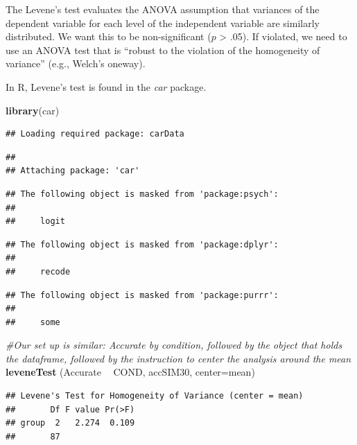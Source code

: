 \documentclass[
  english,
]{book}
\newenvironment{Shaded}{\begin{snugshade}}{\end{snugshade}}
\newcommand{\CommentTok}[1]{\textcolor[rgb]{0.56,0.35,0.01}{\textit{#1}}}
\newcommand{\DataTypeTok}[1]{\textcolor[rgb]{0.13,0.29,0.53}{#1}}
\newcommand{\KeywordTok}[1]{\textcolor[rgb]{0.13,0.29,0.53}{\textbf{#1}}}
\newcommand{\NormalTok}[1]{#1}
\newcommand{\OperatorTok}[1]{\textcolor[rgb]{0.81,0.36,0.00}{\textbf{#1}}}
\newcommand{\StringTok}[1]{\textcolor[rgb]{0.31,0.60,0.02}{#1}}
\begin{document}
The Levene's test evaluates the ANOVA assumption that variances of the dependent variable for each level of the independent variable are similarly distributed. We want this to be non-significant (\(p\) \textgreater{} .05). If violated, we need to use an ANOVA test that is ``robust to the violation of the homogeneity of variance'' (e.g., Welch's oneway).

In R, Levene's test is found in the \emph{car} package.

\begin{Shaded}
\begin{Highlighting}[]
\KeywordTok{library}\NormalTok{(car)}
\end{Highlighting}
\end{Shaded}

\begin{verbatim}
## Loading required package: carData
\end{verbatim}

\begin{verbatim}
## 
## Attaching package: 'car'
\end{verbatim}

\begin{verbatim}
## The following object is masked from 'package:psych':
## 
##     logit
\end{verbatim}

\begin{verbatim}
## The following object is masked from 'package:dplyr':
## 
##     recode
\end{verbatim}

\begin{verbatim}
## The following object is masked from 'package:purrr':
## 
##     some
\end{verbatim}

\begin{Shaded}
\begin{Highlighting}[]
\CommentTok{#Our set up is similar:  Accurate by condition, followed by the object that holds the dataframe, followed by the instruction to center the analysis around the mean}
\KeywordTok{leveneTest}\NormalTok{ (Accurate }\OperatorTok{~}\StringTok{ }\NormalTok{COND, accSIM30, }\DataTypeTok{center=}\NormalTok{mean)}
\end{Highlighting}
\end{Shaded}

\begin{verbatim}
## Levene's Test for Homogeneity of Variance (center = mean)
##       Df F value Pr(>F)
## group  2   2.274  0.109
##       87
\end{verbatim}
\end{document}
